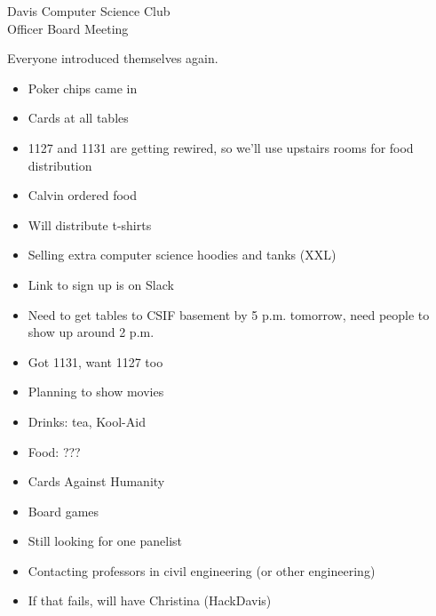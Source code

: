 \documentclass{article}
\begin{document}
\begin{Minutes}{Davis Computer Science Club\\Officer Board Meeting}




\maketitle

Everyone introduced themselves again.

\begin{itemize}
\item Poker chips came in
\item Cards at all tables
\item 1127 and 1131 are getting rewired, so we'll use upstairs rooms for food distribution
\item Calvin ordered food
\item Will distribute t-shirts
\item Selling extra computer science hoodies and tanks (XXL)
\item Link to sign up is on Slack
\item Need to get tables to CSIF basement by 5 p.m. tomorrow, need people to show up around 2 p.m.
\end{itemize}

\begin{itemize}
\item Got 1131, want 1127 too
\item Planning to show movies
\item Drinks: tea, Kool-Aid
\item Food: ???
\item Cards Against Humanity
\item Board games
\end{itemize}

\begin{itemize}
\item Still looking for one panelist
\item Contacting professors in civil engineering (or other engineering)
\item If that fails, will have Christina (HackDavis)
\end{itemize}


\end{Minutes}
\end{document}
